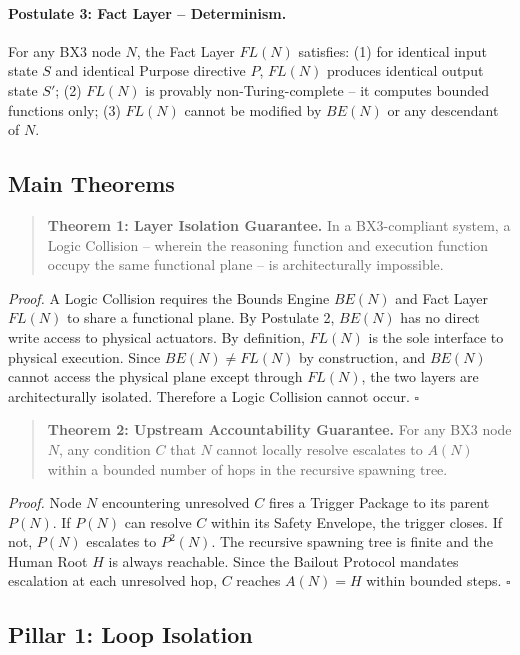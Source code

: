 \documentclass[12pt]{article}
\begin{document}
\paragraph{Postulate 3: Fact Layer -- Determinism.}
\label{post:p3}
For any BX3 node $N$, the Fact Layer $FL(N)$ satisfies: (1) for identical input state $S$ and identical Purpose directive $P$, $FL(N)$ produces identical output state $S'$; (2) $FL(N)$ is provably non-Turing-complete -- it computes bounded functions only; (3) $FL(N)$ cannot be modified by $BE(N)$ or any descendant of $N$.

\subsection{Main Theorems}

\begin{quote}
\textbf{Theorem 1: Layer Isolation Guarantee.} In a BX3-compliant system, a Logic Collision -- wherein the reasoning function and execution function occupy the same functional plane -- is architecturally impossible.
\end{quote}
\textit{Proof.} A Logic Collision requires the Bounds Engine $BE(N)$ and Fact Layer $FL(N)$ to share a functional plane. By Postulate 2, $BE(N)$ has no direct write access to physical actuators. By definition, $FL(N)$ is the sole interface to physical execution. Since $BE(N) \neq FL(N)$ by construction, and $BE(N)$ cannot access the physical plane except through $FL(N)$, the two layers are architecturally isolated. Therefore a Logic Collision cannot occur. $\square$

\begin{quote}
\textbf{Theorem 2: Upstream Accountability Guarantee.} For any BX3 node $N$, any condition $C$ that $N$ cannot locally resolve escalates to $A(N)$ within a bounded number of hops in the recursive spawning tree.
\end{quote}
\textit{Proof.} Node $N$ encountering unresolved $C$ fires a Trigger Package to its parent $P(N)$. If $P(N)$ can resolve $C$ within its Safety Envelope, the trigger closes. If not, $P(N)$ escalates to $P^2(N)$. The recursive spawning tree is finite and the Human Root $H$ is always reachable. Since the Bailout Protocol mandates escalation at each unresolved hop, $C$ reaches $A(N) = H$ within bounded steps. $\square$


\subsection{Pillar 1: Loop Isolation}
\end{document}
